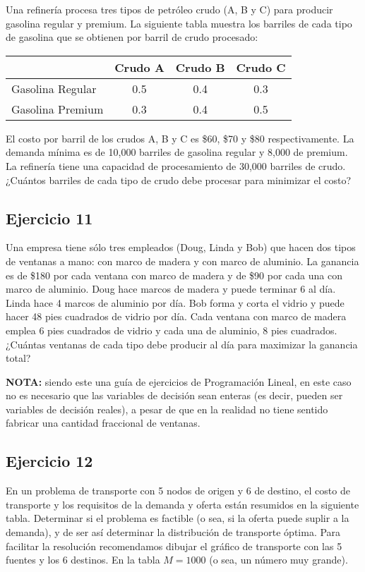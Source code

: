 \documentclass[12pt]{article}
\begin{document}
Una refinería procesa tres tipos de petróleo crudo (A, B y C) para producir gasolina regular y premium. La siguiente tabla muestra los barriles de cada tipo de gasolina que se obtienen por barril de crudo procesado:

\begin{center}
\begin{tabular}{lccc}
\toprule
& Crudo A & Crudo B & Crudo C \\
\midrule
Gasolina Regular & 0.5 & 0.4 & 0.3 \\
Gasolina Premium & 0.3 & 0.4 & 0.5 \\
\bottomrule
\end{tabular}
\end{center}

El costo por barril de los crudos A, B y C es \$60, \$70 y \$80 respectivamente. La demanda mínima es de 10,000 barriles de gasolina regular y 8,000 de premium. La refinería tiene una capacidad de procesamiento de 30,000 barriles de crudo. ¿Cuántos barriles de cada tipo de crudo debe procesar para minimizar el costo?

\subsection{Ejercicio 11}

Una empresa tiene sólo tres empleados (Doug, Linda y Bob) que hacen dos tipos de ventanas a mano: con marco de madera y con marco de aluminio. La ganancia es de \$180 por cada ventana con marco de madera y de \$90 por cada una con marco de aluminio. Doug hace marcos de madera y puede terminar 6 al día. Linda hace 4 marcos de aluminio por día. Bob forma y corta el vidrio y puede hacer 48 pies cuadrados de vidrio por día. Cada ventana con marco de madera emplea 6 pies cuadrados de vidrio y cada una de aluminio, 8 pies cuadrados. ¿Cuántas ventanas de cada tipo debe producir al día para maximizar la ganancia total?

\textbf{NOTA:} siendo este una guía de ejercicios de Programación Lineal, en este caso no es necesario que las variables de decisión sean enteras (es decir, pueden ser variables de decisión reales), a pesar de que en la realidad no tiene sentido fabricar una cantidad fraccional de ventanas.

\subsection{Ejercicio 12}

En un problema de transporte con 5 nodos de origen y 6 de destino, el costo de transporte y los requisitos de la demanda y oferta están resumidos en la siguiente tabla. Determinar si el problema es factible (o sea, si la oferta puede suplir a la demanda), y de ser así determinar la distribución de transporte óptima. Para facilitar la resolución recomendamos dibujar el gráfico de transporte con las 5 fuentes y los 6 destinos. En la tabla \(M = 1000\) (o sea, un número muy grande).
\end{document}
